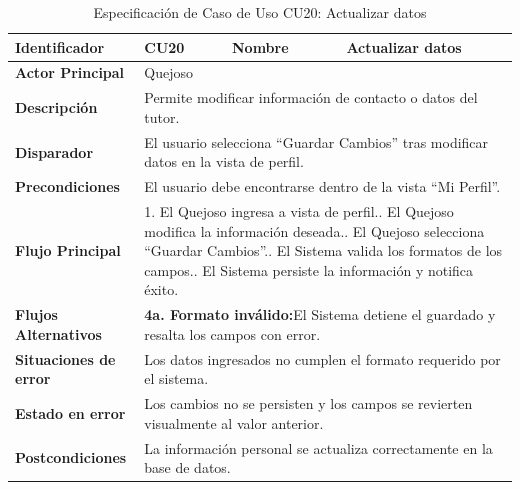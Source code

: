 \begingroup
\setlength{\parskip}{0pt}
\begin{longtable}{|p{3.5cm}|p{2cm}|p{2.5cm}|p{7cm}|}
\caption{Especificación de Caso de Uso CU20: Actualizar datos}
\label{tab:cu20_actualizar_datos} \\
\hline
\textbf{Identificador} & CU20 & \textbf{Nombre} & Actualizar datos \\ \hline
\textbf{Actor Principal} & \multicolumn{3}{p{11.5cm}|}{Quejoso} \\ \hline
\textbf{Descripción} & \multicolumn{3}{p{11.5cm}|}{Permite modificar información de contacto o datos del tutor.} \\ \hline
\textbf{Disparador} & \multicolumn{3}{p{11.5cm}|}{El usuario selecciona ``Guardar Cambios'' tras modificar datos en la vista de perfil.} \\ \hline
\textbf{Precondiciones} & \multicolumn{3}{p{11.5cm}|}{El usuario debe encontrarse dentro de la vista ``Mi Perfil''.} \\ \hline
\textbf{Flujo Principal} & \multicolumn{3}{p{11.5cm}|}{1. El Quejoso ingresa a vista de perfil.\newline 2. El Quejoso modifica la información deseada.\newline 3. El Quejoso selecciona ``Guardar Cambios''.\newline 4. El Sistema valida los formatos de los campos.\newline 5. El Sistema persiste la información y notifica éxito.} \\ \hline
\textbf{Flujos Alternativos} & \multicolumn{3}{p{11.5cm}|}{\textbf{4a. Formato inválido:}\newline El Sistema detiene el guardado y resalta los campos con error.} \\ \hline
\textbf{Situaciones de error} & \multicolumn{3}{p{11.5cm}|}{Los datos ingresados no cumplen el formato requerido por el sistema.} \\ \hline
\textbf{Estado en error} & \multicolumn{3}{p{11.5cm}|}{Los cambios no se persisten y los campos se revierten visualmente al valor anterior.} \\ \hline
\textbf{Postcondiciones} & \multicolumn{3}{p{11.5cm}|}{La información personal se actualiza correctamente en la base de datos.} \\ \hline
\end{longtable}
\endgroup
